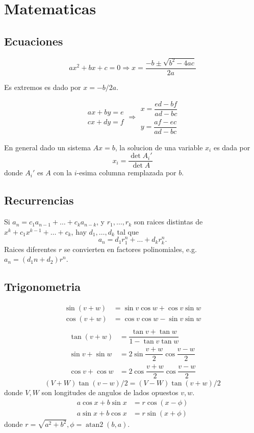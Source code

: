 
\chapter{Matematicas}

\section{Ecuaciones}
\[ax^2+bx+c=0 \Rightarrow x = \frac{-b\pm\sqrt{b^2-4ac}}{2a}\]

Es extremos es dado por $x = -b/2a$.

\[\begin{aligned}ax+by=e\\cx+dy=f\end{aligned}
\Rightarrow
\begin{aligned}x=\dfrac{ed-bf}{ad-bc}\\y=\dfrac{af-ec}{ad-bc}\end{aligned}\]

En general dado un sistema $Ax = b$, la solucion de una variable $x_i$ es dada por
\[x_i = \frac{\det A_i'}{\det A} \]
donde $A_i'$ es $A$ con la $i$-esima columna remplazada por $b$.

\section{Recurrencias}
Si $a_n = c_1 a_{n-1} + \dots + c_k a_{n-k}$, y $r_1, \dots, r_k$ son raices distintas de $x^k + c_1 x^{k-1} + \dots + c_k$, hay $d_1, \dots, d_k$ tal que
\[a_n = d_1r_1^n + \dots + d_kr_k^n. \]
Raices diferentes $r$ se convierten en factores polinomiales, e.g. $a_n = (d_1n + d_2)r^n$.

\section{Trigonometria}
\begin{align*}
\sin(v+w)&{}=\sin v\cos w+\cos v\sin w\\
\cos(v+w)&{}=\cos v\cos w-\sin v\sin w\\
\end{align*}
\begin{align*}
\tan(v+w)&{}=\dfrac{\tan v+\tan w}{1-\tan v\tan w}\\
\sin v+\sin w&{}=2\sin\dfrac{v+w}{2}\cos\dfrac{v-w}{2}\\
\cos v+\cos w&{}=2\cos\dfrac{v+w}{2}\cos\dfrac{v-w}{2}
\end{align*}
\[ (V+W)\tan(v-w)/2{}=(V-W)\tan(v+w)/2 \]
donde $V, W$ son longitudes de angulos de lados opuestos $v, w$.
\begin{align*}
	a\cos x+b\sin x&=r\cos(x-\phi)\\
	a\sin x+b\cos x&=r\sin(x+\phi)
\end{align*}
donde $r=\sqrt{a^2+b^2}, \phi=\operatorname{atan2}(b,a)$.

